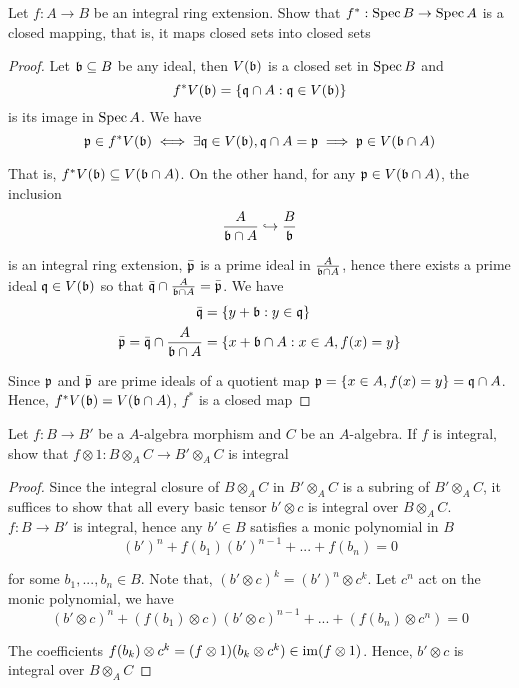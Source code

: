 \begin{problem}
	Let $f: A \to B$ be an integral ring extension. Show that $f^*: \operatorname{Spec} B \to \operatorname{Spec} A$ is a closed mapping, that is, it maps closed sets into closed sets
\end{problem}

\begin{proof}
	Let $\mathfrak{b} \subseteq B$ be any ideal, then $V(\mathfrak{b})$  is a closed set in $\operatorname{Spec} B$ and 
	$$
		f^* V(\mathfrak{b}) = \{\mathfrak{q} \cap A: \mathfrak{q} \in V(\mathfrak{b})\}
	$$
	is its image in $\operatorname{Spec} A$. We have
	$$
		\mathfrak{p} \in f^* V(\mathfrak{b}) \iff \exists \mathfrak{q} \in V(\mathfrak{b}), \mathfrak{q} \cap A = \mathfrak{p} \implies \mathfrak{p} \in V(\mathfrak{b} \cap A)
	$$
	
	That is, $f^* V(\mathfrak{b}) \subseteq V(\mathfrak{b} \cap A)$. On the other hand, for any $\mathfrak{p} \in V(\mathfrak{b} \cap A)$, the inclusion
	$$
		\frac{A}{\mathfrak{b} \cap A} \hookrightarrow \frac{B}{\mathfrak{b}}
	$$
	
	is an integral ring extension, $\bar{\mathfrak{p}}$ is a prime ideal in $\frac{A}{\mathfrak{b} \cap A}$, hence there exists a prime ideal $\mathfrak{q} \in V(\mathfrak{b})$ so that $\bar{\mathfrak{q}} \cap \frac{A}{\mathfrak{b} \cap A} = \bar{\mathfrak{p}}$. We have
	\begin{align*}
		\bar{\mathfrak{q}} &= \{y + \mathfrak{b}: y \in \mathfrak{q}\} \\
		\bar{\mathfrak{p}} = \bar{\mathfrak{q}} \cap  \frac{A}{\mathfrak{b} \cap A} &= \{x +\mathfrak{b} \cap A: x \in A, f(x) = y\}
	\end{align*}
	
	Since $\mathfrak{p}$ and $\bar{\mathfrak{p}}$ are prime ideals of a quotient map $\mathfrak{p} = \{x \in A, f(x) = y\} = \mathfrak{q} \cap A$. Hence, $f^* V(\mathfrak{b}) = V(\mathfrak{b} \cap A)$, $f^*$ is a closed map
\end{proof}

\begin{problem}
	Let $f: B \to B'$ be a $A$-algebra morphism and $C$ be an $A$-algebra. If $f$ is integral, show that $f \otimes 1: B \otimes_A C \to B' \otimes_A C$ is integral
\end{problem}

\begin{proof}
	Since the integral closure of $B \otimes_A C$ in $B' \otimes_A C$ is a subring of $B' \otimes_A C$, it suffices to show that all every basic tensor $b' \otimes c$ is integral over $B \otimes_A C$. $f: B \to B'$ is integral, hence any $b' \in B$ satisfies a monic polynomial in $B$
	$$
		(b')^n + f(b_1) (b')^{n-1} + ... + f(b_n) = 0 
	$$
	
	for some $b_1, ..., b_n \in B$. Note that, $(b' \otimes c)^k = (b')^n \otimes c^k$. Let $c^n$ act on the monic polynomial, we have
	$$
		(b' \otimes c)^n + (f(b_1) \otimes c) (b' \otimes c)^{n-1} + ... + (f(b_n) \otimes c^n) = 0 
	$$
	
	The coefficients $f(b_k) \otimes c^k = (f \otimes 1)(b_k \otimes c^k) \in \operatorname{im} (f \otimes 1)$. Hence, $b' \otimes c$ is integral over $B \otimes_A C$
\end{proof}

